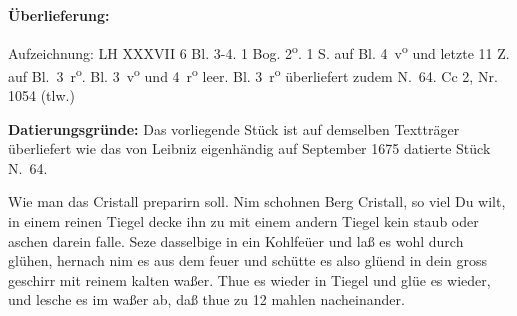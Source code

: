 \begin{ledgroupsized}[r]{120mm}%
\footnotesize%
\pstart%
\noindent\textbf{\"{U}berlieferung:}%
\pend%
\end{ledgroupsized}%
%
\begin{ledgroupsized}[r]{114mm}%
\footnotesize%
\pstart%
\parindent -6mm%
%
Aufzeichnung: LH XXXVII 6 Bl. 3-4.
1 Bog. 2\textsuperscript{o}. 1 S. auf Bl. 4~v\textsuperscript{o} und letzte 11 Z. auf Bl.~3~r\textsuperscript{o}.
Bl. 3~v\textsuperscript{o} und 4~r\textsuperscript{o} leer.
Bl. 3~r\textsuperscript{o} überliefert zudem N.~64.%
\newline%
Cc 2, Nr. 1054 (tlw.)%
\pend%
\end{ledgroupsized}%
\vspace*{5mm}%
%
\begin{ledgroup}%
\footnotesize
\pstart
\noindent\footnotesize{\textbf{Datierungsgr\"{u}nde:}
Das vorliegende Stück ist auf demselben Textträger überliefert wie das von Leibniz eigenhändig auf September 1675 datierte Stück N.~64. %
}%
\pend%
\end{ledgroup}%
%
\vspace{6mm}%
\pstart
\noindent
[4~v\textsuperscript{o}]
\pend
\pstart%
\normalsize%
\centering%
\pend%
\vspace{2mm}%
\count{}
\count{}
\count{}
\pstart%
\noindent%
%
Wie man das Cristall preparirn soll. Nim schohnen Berg Cristall\protect{}, so viel Du wilt, in einem reinen Tiegel\protect{} decke ihn zu mit einem andern Tiegel\protect{}
kein staub oder aschen darein falle. Seze dasselbige in ein Kohlfe\"{u}er und la{\ss} es wohl durch gl\"{u}hen, hernach nim es aus dem feuer und sch\"{u}tte es also gl\"{u}end in dein gross geschirr mit reinem kalten wa{\ss}er. Thue es wieder in Tiegel\protect{} und gl\"{u}e es wieder, und lesche es im wa{\ss}er ab, da{\ss} thue zu 12 mahlen nacheinander.
